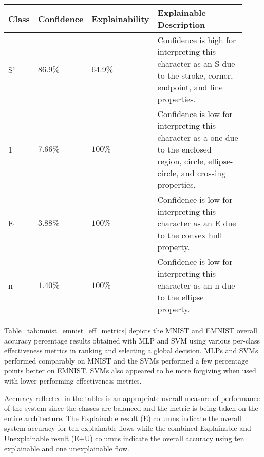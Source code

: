 \begin{table}[H]
    \renewcommand{\arraystretch}{1.3}
     \label{table:exexample4epars}
    \begin{center}
    \begin{tabular}{| m{0.06\linewidth} | m{0.14\linewidth} | m{0.17\linewidth} | m{0.55\linewidth} |}
    \hline
     Class & Confidence & Explainability & Explainable Description \\
    \hline \hline
    S\rq & $86.9\%$ & $64.9\%$ & Confidence is high for interpreting this character as an S due to the stroke, corner, endpoint, and line properties. \\ 
    \hline
    1 & $7.66\%$ & $100\%$ & Confidence is low for interpreting this character as a one due to the enclosed region, circle, ellipse-circle, and crossing properties. \\
    \hline
    E & $3.88\%$ & $100\%$ & Confidence is low for interpreting this character as an E due to the convex hull property. \\
    \hline
    n & $1.40\%$ & $100\%$ & Confidence is low for interpreting this character as an n due to the ellipse property. \\
    \hline
    \end{tabular}
    \end{center}
\end{table}   

Table~\ref{tab:mnist_emnist_eff_metrics} depicts the MNIST and EMNIST overall
accuracy percentage results obtained with MLP and SVM using various per-class
effectiveness metrics in ranking and selecting a global decision. MLPs and SVMs
performed comparably on MNIST and the SVMs performed a few percentage points
better on EMNIST.  SVMs also appeared to be more forgiving when used with lower
performing effectiveness metrics. 

Accuracy reflected in the tables is an appropriate overall measure of
performance of the system since the classes are balanced and the metric is being
taken on the entire architecture. The Explainable result (E) columns indicate
the overall system accuracy for ten explainable flows while the combined
Explainable and Unexplainable result (E+U) columns indicate the overall
accuracy using ten explainable and one unexplainable flow.

